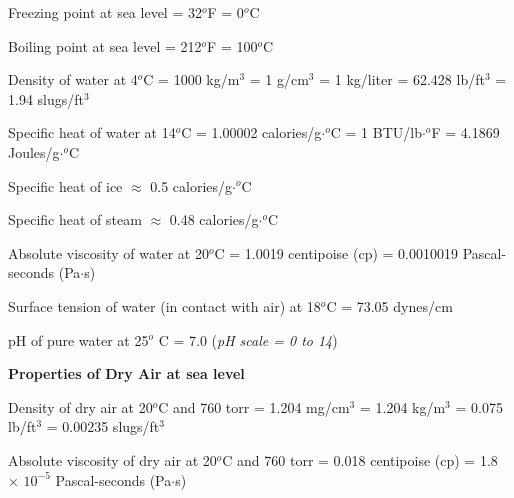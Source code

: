 \vskip 5pt {\narrower \noindent \baselineskip5pt
Freezing point at sea level = 32$^{o}$F = 0$^{o}$C
\par} \vskip 5pt
\vskip 5pt {\narrower \noindent \baselineskip5pt
Boiling point at sea level = 212$^{o}$F = 100$^{o}$C
\par} \vskip 5pt
\vskip 5pt {\narrower \noindent \baselineskip5pt
Density of water at 4$^{o}$C = 1000 kg/m$^{3}$ = 1 g/cm$^{3}$ = 1 kg/liter = 62.428 lb/ft$^{3}$ = 1.94 slugs/ft$^{3}$
\par} \vskip 5pt
\vskip 5pt {\narrower \noindent \baselineskip5pt
Specific heat of water at 14$^{o}$C = 1.00002 calories/g$\cdot$$^{o}$C = 1 BTU/lb$\cdot$$^{o}$F = 4.1869 Joules/g$\cdot$$^{o}$C
\par} \vskip 5pt
\vskip 5pt {\narrower \noindent \baselineskip5pt
Specific heat of ice $\approx$ 0.5 calories/g$\cdot$$^{o}$C
\par} \vskip 5pt
\vskip 5pt {\narrower \noindent \baselineskip5pt
Specific heat of steam $\approx$ 0.48 calories/g$\cdot$$^{o}$C
\par} \vskip 5pt
\vskip 5pt {\narrower \noindent \baselineskip5pt
Absolute viscosity of water at 20$^{o}$C = 1.0019 centipoise (cp) = 0.0010019 Pascal-seconds (Pa$\cdot$s)
\par} \vskip 5pt
\vskip 5pt {\narrower \noindent \baselineskip5pt
Surface tension of water (in contact with air) at 18$^{o}$C = 73.05 dynes/cm
\par} \vskip 5pt
\vskip 5pt {\narrower \noindent \baselineskip5pt
pH of pure water at 25$^{o}$ C = 7.0 ({\it pH scale = 0 to 14})
\par} \vskip 10pt
\bigskip 
 

\goodbreak 
{\bf Properties of Dry Air at sea level}

\vskip 5pt {\narrower \noindent \baselineskip5pt
Density of dry air at 20$^{o}$C and 760 torr = 1.204 mg/cm$^{3}$ = 1.204 kg/m$^{3}$ = 0.075 lb/ft$^{3}$ = 0.00235 slugs/ft$^{3}$
\par} \vskip 5pt
\vskip 5pt {\narrower \noindent \baselineskip5pt
Absolute viscosity of dry air at 20$^{o}$C and 760 torr = 0.018 centipoise (cp) = 1.8 $\times$ $10^{-5}$ Pascal-seconds (Pa$\cdot$s)
\par} \vskip 5pt
\bigskip 
 


\vfil

\eject


